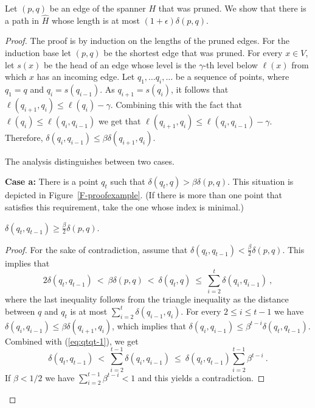\documentclass[proceedings]{stacs}
\theoremstyle{plain}\newtheorem{satz}[thm]{Satz}
\theoremstyle{definition}\newtheorem{crucial}[thm]{Crucial Definition}
\newcommand{\eps}{\epsilon}
\begin{document}
\begin{lemma}\label{L-Stretch1}
Let $(p,q)$ be an edge of the spanner $H$ that was pruned. We show
that there is a path in $\hat{H}$ whose length is at most
$(1+\eps)\delta(p,q)$.
\end{lemma}
\begin{proof}
The proof is by induction on the lengths of the pruned edges. For
the induction base let $(p,q)$ be the shortest edge that was
pruned. For every $x\in V$, let $s(x)$ be the head of an edge
whose level is the $\gamma$-th level below $\ell(x)$ from which
$x$ has an incoming edge. Let $q_1,\ldots q_i, \ldots$ be a
sequence of points, where  $q_1 = q$ and $q_i = s(q_{i-1})$. As
$q_{i+1} = s(q_{i})$, it follows that $\ell(q_{i+1},q_{i})\leq
\ell(q_{i})-\gamma$. Combining this with the fact that
$\ell(q_i)\leq \ell(q_i,q_{i-1})$ we get that
$\ell(q_{i+1},q_i)\leq \ell(q_i,q_{i-1})-\gamma$. Therefore,
$\delta(q_i,q_{i-1})\leq \beta \delta(q_{i+1},q_i)$.

The analysis distinguishes between two cases.

{\bf Case a:} There is a point $q_t$ such that $\delta(q_t,q)> \beta
\delta(p,q)$. This situation is depicted in
Figure~\ref{F-proofexample}. (If there is more than one point that
satisfies this requirement, take the one whose index is minimal.)

\par\bigskip{}
$\delta(q_t,q_{t-1})\geq \frac{\beta}{2} \delta(p,q)$.

\begin{proof}
For the sake of contradiction, assume that
$\delta(q_t,q_{t-1})<\frac{\beta}{2}\delta(p,q)$. This implies
that
\begin{equation}
\label{eq:qtqt-1} 2\delta(q_t,q_{t-1}) ~<~ \beta\delta(p,q) ~<~
\delta(q_t,q) ~\leq~ \sum_{i=2}^{t} \delta(q_{i}, q_{i-1})~,
\end{equation}
where the last inequality follows from the triangle inequality as
the distance between $q$ and $q_t$ is at most $\sum_{i=2}^{t}
\delta(q_{i-1}, q_{i})$.
For every $2\leq i\leq t-1$ we have $\delta(q_i,q_{i-1}) \leq
\beta \delta(q_{i+1},q_i)$, which implies that
$\delta(q_i,q_{i-1}) \leq \beta^{t-i} \delta(q_t , q_{t-1})$.
Combined with (\ref{eq:qtqt-1}), we get
$$\delta(q_t,q_{t-1}) ~<~ \sum_{i=2}^{t-1} \delta(q_i,q_{i-1}) ~\leq~
\delta(q_t ,q_{t-1}) \sum_{i=2}^{t-1}  \beta^{t-i}~.$$ If $\beta <
1/2$ we have $\sum_{i=2}^{t-1}  \beta^{t-i}<1$ and this yields a
contradiction.
\end{proof}


\end{proof}
\end{document}
